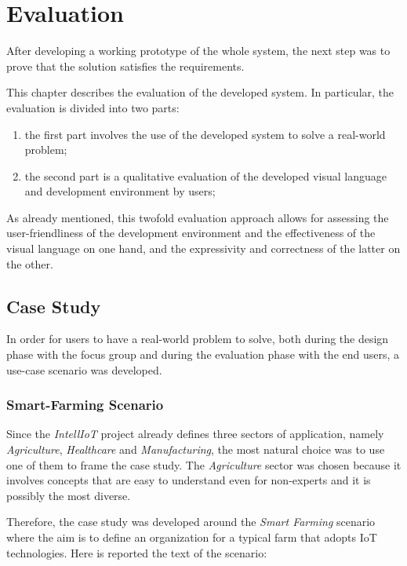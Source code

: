 \chapter{Evaluation}\label{chap:evaluation}
After developing a working prototype of the whole system, the next step was to prove that the solution satisfies the requirements.

This chapter describes the evaluation of the developed system.
In particular, the evaluation is divided into two parts:
\begin{enumerate}
    \item the first part involves the use of the developed system to solve a real-world problem;
    \item the second part is a qualitative evaluation of the developed visual language and development environment by users;
\end{enumerate}
As already mentioned, this twofold evaluation approach allows for assessing the user-friendliness of the development environment and the effectiveness of the visual language on one hand, and the expressivity and correctness of the latter on the other.

\section{Case Study}
In order for users to have a real-world problem to solve, both during the design phase with the focus group and during the evaluation phase with the end users, a use-case scenario was developed.

\subsection{Smart-Farming Scenario}

Since the \textit{IntellIoT} project already defines three sectors of application, namely \textit{Agriculture}, \textit{Healthcare} and \textit{Manufacturing}, the most natural choice was to use one of them to frame the case study.
The \textit{Agriculture} sector was chosen because it involves concepts that are easy to understand even for non-experts and it is possibly the most diverse.

Therefore, the case study was developed around the \textit{Smart Farming} scenario where the aim is to define an organization for a typical farm that adopts IoT technologies. Here is reported the text of the scenario:

